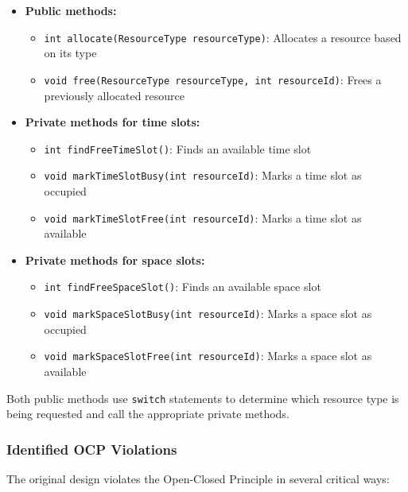 \begin{itemize}
    \item \textbf{Public methods:}
    \begin{itemize}
        \item \texttt{int allocate(ResourceType resourceType)}: Allocates a resource based on its type
        \item \texttt{void free(ResourceType resourceType, int resourceId)}: Frees a previously allocated resource
    \end{itemize}
    
    \item \textbf{Private methods for time slots:}
    \begin{itemize}
        \item \texttt{int findFreeTimeSlot()}: Finds an available time slot
        \item \texttt{void markTimeSlotBusy(int resourceId)}: Marks a time slot as occupied
        \item \texttt{void markTimeSlotFree(int resourceId)}: Marks a time slot as available
    \end{itemize}
    
    \item \textbf{Private methods for space slots:}
    \begin{itemize}
        \item \texttt{int findFreeSpaceSlot()}: Finds an available space slot
        \item \texttt{void markSpaceSlotBusy(int resourceId)}: Marks a space slot as occupied
        \item \texttt{void markSpaceSlotFree(int resourceId)}: Marks a space slot as available
    \end{itemize}
\end{itemize}

Both public methods use \texttt{switch} statements to determine which resource type is being requested and call the appropriate private methods.

\subsubsection{Identified OCP Violations}

The original design violates the Open-Closed Principle in several critical ways:

